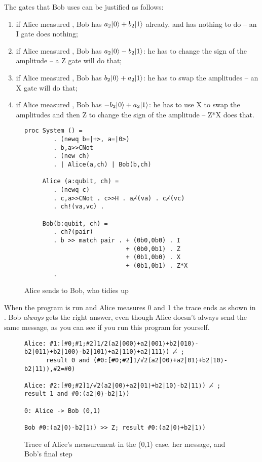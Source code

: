 \documentclass[11pt,a4paper]{book}
\begin{document}
The gates that Bob uses can be justified as follows:

\begin{enumerate}
\item if Alice measured \zerozero, Bob has $a_{2}|\hspace{0.5pt}0\rangle+b_{2}|1\rangle\relax$ already, and has nothing to do -- an I gate does nothing; 
\item if Alice measured \zeroone, Bob has $a_{2}|\hspace{0.5pt}0\rangle-b_{2}|1\rangle\relax$: he has to change the sign of the \one{} amplitude -- a Z gate will do that;
\item if Alice measured \onezero, Bob has $b_{2}|\hspace{0.5pt}0\rangle+a_{2}|1\rangle\relax$: he has to swap the amplitudes -- an X gate will do that;
\item if Alice measured \oneone, Bob has $-b_{2}|\hspace{0.5pt}0\rangle+a_{2}|1\rangle\relax$: he has to use X to swap the amplitudes and then Z to change the sign of the \one{} amplitude -- Z*X does that. 
\end{enumerate}

\begin{figure}
\begin{verbatim}
proc System () = 
        . (newq b=|+>, a=|0>)  
        . b,a>>CNot 
        . (new ch)
        . | Alice(a,ch) | Bob(b,ch)

     Alice (a:qubit, ch) = 
        . (newq c) 
        . c,a>>CNot . c>>H . a⌢̸(va) . c⌢̸(vc)
        . ch!(va,vc) .

     Bob(b:qubit, ch) = 
        . ch?(pair)
        . b >> match pair . + (0b0,0b0) . I
                            + (0b0,0b1) . Z
                            + (0b1,0b0) . X
                            + (0b1,0b1) . Z*X 
        .
\end{verbatim}
\caption{Alice sends to Bob, who tidies up}
\end{figure}

When the program is run and Alice measures 0 and 1 the trace ends as shown in . Bob \emph{always} gets the right answer, even though Alice doesn't always send the same message, as you can see if you run this program for yourself.
\begin{figure}
\begin{verbatim}
Alice: #1:[#0;#1;#2]1/2(a2|000⟩+a2|001⟩+b2|010⟩-b2|011⟩+b2|100⟩-b2|101⟩+a2|110⟩+a2|111⟩) ⌢̸ ; 
      result 0 and (#0:[#0;#2]1/√2(a2|00⟩+a2|01⟩+b2|10⟩-b2|11⟩),#2=#0)

Alice: #2:[#0;#2]1/√2(a2|00⟩+a2|01⟩+b2|10⟩-b2|11⟩) ⌢̸ ; result 1 and #0:(a2|0⟩-b2|1⟩)

0: Alice -> Bob (0,1)

Bob #0:(a2|0⟩-b2|1⟩) >> Z; result #0:(a2|0⟩+b2|1⟩)
\end{verbatim}
\caption{Trace of Alice's measurement in the (0,1) case, her message, and Bob's final step}
\end{figure}
\end{document}
